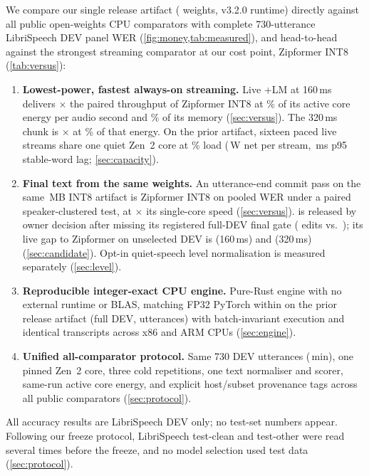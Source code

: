  We compare our single release artifact (\ultra{} \ReleaseVer{} weights, v3.2.0
runtime) directly against all \ColdCompleteCompCount{} public open-weights CPU comparators with complete
730-utterance LibriSpeech DEV panel WER (\cref{fig:money,tab:measured}), and head-to-head against the
strongest streaming comparator at our cost point, Zipformer INT8 (\cref{tab:versus}):
\begin{enumerate}
\item \textbf{Lowest-power, fastest always-on streaming.} Live +LM at 160\,ms delivers
  \VsSpeedXOne$\times$ the paired throughput of Zipformer INT8 at \VsEnergyPctOne\% of its active
  core energy per audio second and \VsRssPctOne\% of its memory (\cref{sec:versus}). The 320\,ms
  chunk is \VsWideSpeedX$\times$ at \VsWideEnergyPct\% of that energy. On the prior artifact,
  sixteen paced live streams share one quiet Zen~2 core at \RelCapSixteenBusy\% load
  (\RelCapSixteenNetW\,W net per stream, \RelCapSixteenLagPninetyFive\,ms p95 stable-word lag;
  \cref{sec:capacity}).
\item \textbf{Final text from the same weights.} An utterance-end commit pass on the same \ColdHeadModel\,MB INT8
  artifact is \VsVerdictTwo{} Zipformer INT8 on pooled WER under a paired speaker-clustered test, at
  \VsSpeedXTwo$\times$ its single-core speed (\cref{sec:versus}). \ultra{} \ReleaseVer{} is released by
  owner decision after missing its registered full-DEV final gate (\CandFinalFullEdits{} edits vs.\
  \CandGateFinalFull); its live gap to Zipformer on unselected DEV is \CandLiveLmCDelta\pp (160\,ms)
  and \CandLiveLmEightCDelta\pp (320\,ms) (\cref{sec:candidate}). Opt-in quiet-speech level
  normalisation is measured separately (\cref{sec:level}).
\item \textbf{Reproducible integer-exact CPU engine.} Pure-Rust engine with no external runtime or
  BLAS, matching FP32 PyTorch within \RelIntEightDelta\pp on the prior release artifact
  (full DEV, \RelFullUtts{} utterances)
  with batch-invariant execution and identical transcripts across x86 and ARM CPUs (\cref{sec:engine}).
\item \textbf{Unified all-comparator protocol.} Same 730 DEV utterances (\ColdAudioMinutes\,min), one
  pinned Zen~2 core, three cold repetitions, one text normaliser and scorer, same-run active core
  energy, and explicit host/subset provenance tags across all \ColdCompleteCompCount{} public
  comparators (\cref{sec:protocol}).
\end{enumerate}

 All accuracy results are LibriSpeech DEV only; no test-set numbers appear.
Following our freeze protocol, LibriSpeech test-clean and test-other were read several times before the
freeze, and no model selection used test data (\cref{sec:protocol}).
